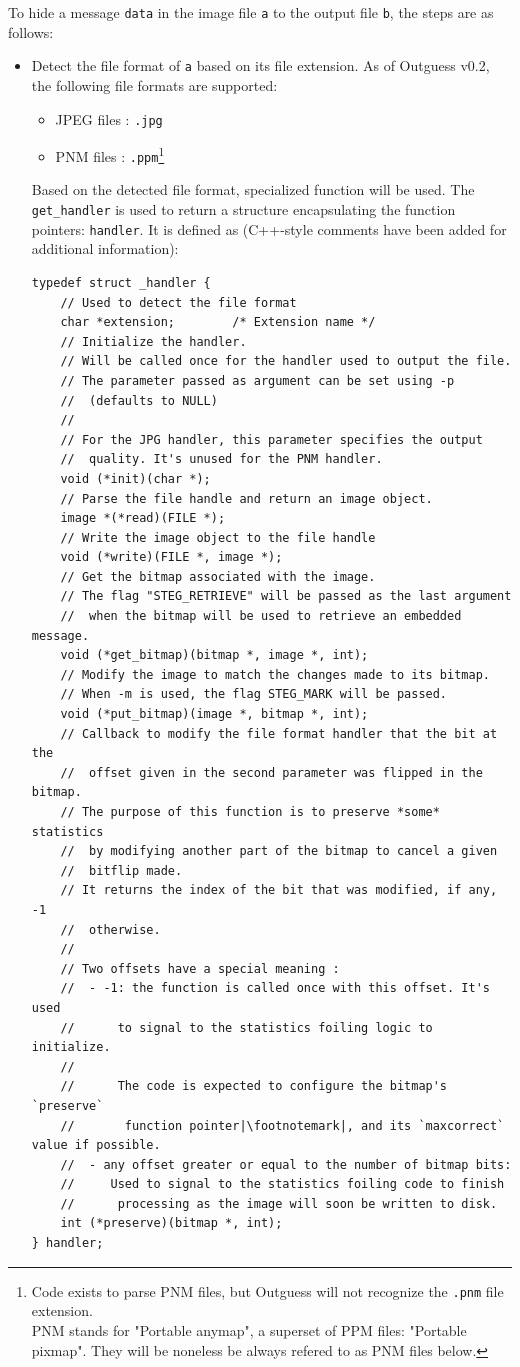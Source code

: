 \documentclass{article}
\begin{document}
To hide a message \texttt{data} in the image file \texttt{a} to the output file \texttt{b}, the steps are as follows:
\begin{itemize}
	\item Detect the file format of \texttt{a} based on its file extension. As of Outguess v0.2, the following file formats are supported:
		\begin{itemize}
			\item JPEG files : \texttt{.jpg}
			\item PNM files : \texttt{.ppm}\footnote{Code exists to parse PNM files, but Outguess will not recognize the \texttt{.pnm} file extension. \\ PNM stands for "Portable anymap", a superset of PPM files: "Portable pixmap". They will be noneless be always refered to as PNM files below.}
		\end{itemize}
	
		Based on the detected file format, specialized function will be used. The \texttt{get\_handler} is used to return a structure encapsulating the function pointers: \texttt{handler}. It is defined as (C++-style comments have been added for additional information):
		
		\begin{verbatim}
typedef struct _handler {
	// Used to detect the file format
	char *extension;        /* Extension name */
	// Initialize the handler.
	// Will be called once for the handler used to output the file.
	// The parameter passed as argument can be set using -p
	//  (defaults to NULL)
	//
	// For the JPG handler, this parameter specifies the output
	//  quality. It's unused for the PNM handler.
	void (*init)(char *);
	// Parse the file handle and return an image object.
	image *(*read)(FILE *);
	// Write the image object to the file handle
	void (*write)(FILE *, image *);
	// Get the bitmap associated with the image.
	// The flag "STEG_RETRIEVE" will be passed as the last argument
	//  when the bitmap will be used to retrieve an embedded message.
	void (*get_bitmap)(bitmap *, image *, int);
	// Modify the image to match the changes made to its bitmap.
	// When -m is used, the flag STEG_MARK will be passed.
	void (*put_bitmap)(image *, bitmap *, int);
	// Callback to modify the file format handler that the bit at the
	//  offset given in the second parameter was flipped in the bitmap.
	// The purpose of this function is to preserve *some* statistics
	//  by modifying another part of the bitmap to cancel a given
	//  bitflip made.
	// It returns the index of the bit that was modified, if any, -1
	//  otherwise.
	//
	// Two offsets have a special meaning :
	//  - -1: the function is called once with this offset. It's used
	//      to signal to the statistics foiling logic to initialize.
	//     
	//      The code is expected to configure the bitmap's `preserve`
	//       function pointer|\footnotemark|, and its `maxcorrect` value if possible.
	//  - any offset greater or equal to the number of bitmap bits:
	//     Used to signal to the statistics foiling code to finish
	//      processing as the image will soon be written to disk.
	int (*preserve)(bitmap *, int);
} handler;
		\end{verbatim}


\end{itemize}
\end{document}

